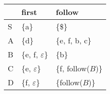 \documentclass{standalone}
\providecommand\lightrule{%
	\arrayrulecolor{black!30}%
	\midrule[\lightrulewidth]%
	\arrayrulecolor{black}}
\begin{document}
\begin{tabularx}{\textwidth}{XXX}
    & first & follow\\
    \midrule
        S
        &
        \{a\} %
        &
        \{\$\} %
        \\ \lightrule
        A
        &
        \{d\} %
        &
        \{e, f, b, c\} %
        \\ \lightrule
        B
        &
        \{e, f, \(\varepsilon\)\} %
        &
        \{b\} %
        \\ \lightrule
        C
        &
        \{e, \(\varepsilon\)\} %
        &
        \{f, follow(\(B\))\} %
        \\ \lightrule
        D
        &
        \{f, \(\varepsilon\)\} %
        &
        \{follow(\(B\))\} %
\end{tabularx}
\end{document}
